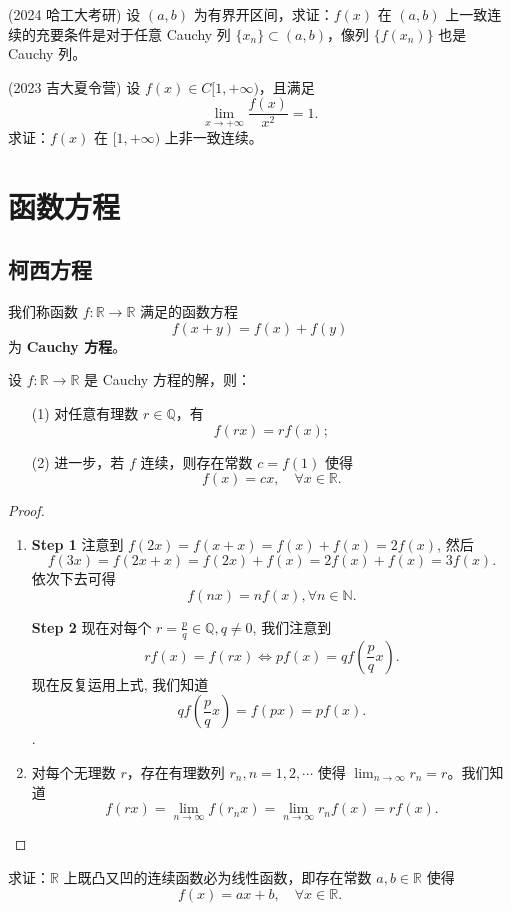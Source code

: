\documentclass[lang=cn,10pt,thmcnt=section]{elegantbook}
\begin{document}
\begin{example}
	(2024 哈工大考研) 设 \( (a,b) \) 为有界开区间，求证：\( f(x) \) 在 \( (a,b) \) 上一致连续的充要条件是对于任意 Cauchy 列 \( \{x_n\} \subset (a,b) \)，像列 \( \{f(x_n)\} \) 也是 Cauchy 列。
\end{example}
\begin{example}
	(2023 吉大夏令营) 设 \( f(x) \in C[1,+\infty) \)，且满足
    \[ \lim_{x \to +\infty} \frac{f(x)}{x^2} = 1. \]
    求证：\( f(x) \) 在 \( [1,+\infty) \) 上非一致连续。
\end{example}
\section{函数方程}
\subsection{柯西方程}
\begin{definition}
	我们称函数 \( f \colon \mathbb{R} \to \mathbb{R} \) 满足的函数方程
\[ f(x + y) = f(x) + f(y) \]
为 \textbf{Cauchy 方程}。
\end{definition}
\begin{example}
	设 \( f \colon \mathbb{R} \to \mathbb{R} \) 是 Cauchy 方程的解，则：
\begin{enumerate}
    \item[(1)] 对任意有理数 \( r \in \mathbb{Q} \)，有
    \[ f(rx) = r f(x); \]
    \item[(2)] 进一步，若 \( f \) 连续，则存在常数 \( c = f(1) \) 使得
    \[ f(x) = c x, \quad \forall x \in \mathbb{R}. \]
\end{enumerate}
\end{example}
\begin{proof}
	\begin{enumerate}
		\item \textbf{Step 1} 注意到 $f(2x) = f(x+x) = f(x) + f(x) = 2f(x)$, 然后
		\[
		f(3x) = f(2x+x) = f(2x)+f(x) = 2f(x)+f(x) = 3f(x).
		\]
		依次下去可得
		\[
		f(nx) = nf(x), \forall n \in \mathbb{N}.
		\]
		
		\noindent\textbf{Step 2} 现在对每个 $r = \frac{p}{q} \in \mathbb{Q}, q \neq 0$, 我们注意到
		\[
		rf(x) = f(rx) \iff pf(x) = qf\left(\frac{p}{q}x\right).
		\]
		现在反复运用上式, 我们知道
		\[
		qf\left(\frac{p}{q}x\right) = f(px) = pf(x).
		\]
.
		\item 对每个无理数 $r$，存在有理数列 $r_n, n=1, 2, \cdots$ 使得 $\lim_{n\to\infty} r_n = r$。我们知道
		\[
		f(rx) = \lim_{n\to\infty} f(r_n x) = \lim_{n\to\infty} r_n f(x) = r f(x).
		\]

	\end{enumerate}
\end{proof}
\begin{example}
	求证：\(\mathbb{R}\) 上既凸又凹的连续函数必为线性函数，即存在常数 \( a, b \in \mathbb{R} \) 使得
\[ f(x) = a x + b, \quad \forall x \in \mathbb{R}. \]
\end{example}
\end{document}
